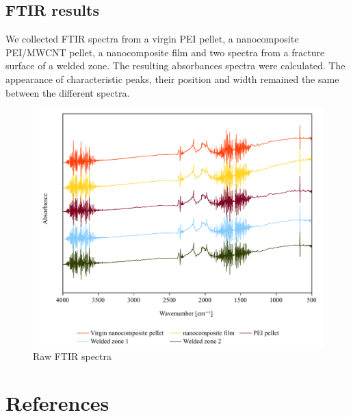 \documentclass[11pt,review,times]{article}
\begin{document}
\subsection{FTIR results}
\FloatBarrier

We collected FTIR spectra from a virgin PEI pellet, a nanocomposite PEI/MWCNT pellet, a nanocomposite film and two spectra from a fracture surface of a welded zone. 
The resulting absorbances spectra were calculated. 
The appearance of characteristic peaks, their position and width remained the same between the different spectra. 

\begin{figure}[h]
	\center
	\includegraphics[width=\textwidth]{FTIR_spectra.pdf}
	\caption{Raw FTIR spectra \cite{Brassard2018_figshare_article1}}
	\label{fig:FTIR_spectra}
\end{figure}



\FloatBarrier
							\section{References}




\end{document}
